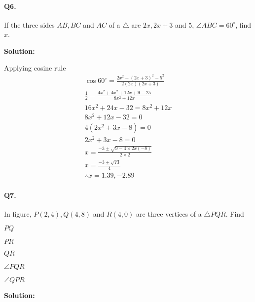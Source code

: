 \documentclass{article}
\begin{document}
\paragraph{Q6.}
If the three sides $AB, BC$ and $AC$ of a $\triangle$ are $2x, 2x+3$ and $5$, $\angle ABC=60^{\circ}$, find $x$.

{\scriptsize \textbf{Solution:}}

Applying cosine rule
\[
  \begin{aligned}
    \cos 60^{\circ} = \frac{2x^{2}+(2x+3)^{2}-5^{2}}{2(2x)(2x+3)} \\
    \frac{1}{2} = \frac{4x^{2}+4x^{2}+12x+9-25}{8x^{2}+12x} \\
    16x^{2}+24x-32 = 8x^{2}+12x \\
    8x^{2}+12x-32 = 0 \\
    4(2x^{2}+3x-8) = 0 \\
    2x^{2}+3x-8 = 0 \\
    x = \frac{-3 \pm \sqrt{9 - 4 \times 2x(-8)}}{2\times2} \\
    x = \frac{-3 \pm \sqrt{73}}{4} \\
    \therefore x = 1.39, -2.89
  \end{aligned}
\]

\paragraph{Q7.}
In figure, $P(2, 4), Q(4, 8)$ and $R(4, 0)$ are three vertices of a $\triangle PQR$. Find


\begin{enumerate*}[label=\roman*)]
  \item $PQ$
  \item $PR$
  \item $QR$
  \item $\angle PQR$
  \item $\angle QPR$
\end{enumerate*}

{\scriptsize \textbf{Solution:}}
\end{document}
